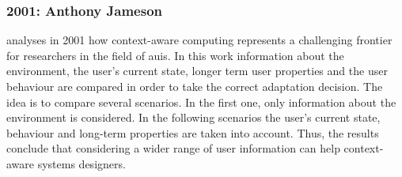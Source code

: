 \subsubsection{2001: Anthony Jameson}
\label{sec:jameson}

\citet{jameson_modelling_2001} analyses in 2001 how context-aware computing 
represents a challenging frontier for researchers in the field of \acp{aui}. 
In this work information about the environment, the user's current 
state, longer term user properties and the user behaviour are compared in order 
to take the correct adaptation decision. The idea is to compare several 
scenarios. In the first one, only information about the environment is 
considered. In the following scenarios the user's current state, behaviour and 
long-term properties are taken into account. Thus, the results conclude 
that considering a wider range of user information can help context-aware 
systems designers.

% 
% 
% 


